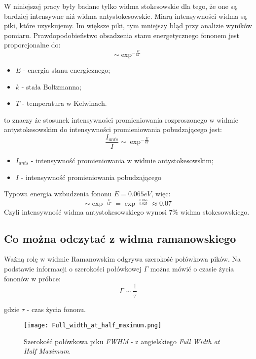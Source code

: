 \vspace{1cm}
W niniejszej pracy były badane tylko widma stokesowskie dla tego, że one są bardziej intensywne niż widma antystokesowskie. Miarą intensywności widma są piki, które uzyskujemy. Im większe piki, tym mniejszy błąd przy analizie wyników pomiaru.
Prawdopodobieństwo obsadzenia stanu energetycznego fononem jest proporcjonalne do:
\begin{equation}
	\sim \exp^{-\frac{E}{kT}} 
\end{equation}
\begin{itemize}
	\item{$E$ - energia stanu energicznego};
	\item{$k$ - stała Boltzmanna};
	\item{$T$ - temperatura w Kelwinach}.
\end{itemize}
to znaczy że stosunek intensywności promieniowania rozproszonego w widmie antystokesowskim
do intensywności promieniowania pobudzającego jest:
\begin{equation}
	\frac{I_{ants}}{I} \sim \exp^{-\frac{E}{kT}}
\end{equation}
\begin{itemize}
	\item{$I_{ants}$ - intensywność promieniowania w widmie antystokesowskim};
	\item{$I$ - intensywność promieniowania pobudzającego}
\end{itemize}
	Typowa energia wzbudzenia fononu $E = 0.065eV$, więc:
\begin{equation}
	\sim \exp^{-\frac{E}{kT}} = \exp^{-\frac{0.065}{0.025}} \approx 0.07
\end{equation}
Czyli intensywność widma antystokesowskiego wynosi $7\%$ widma stokesowskiego. 
\subsection{Co można odczytać z widma ramanowskiego}
Ważną rolę w widmie Ramanowskim odgrywa szerokość połówkowa pików.
Na podstawie informacji o szerokości połówkowej $\Gamma$ można mówić o czasie życia fononów w próbce:
\begin{equation}
	\Gamma \sim \frac{1}{\tau}
\end{equation}

gdzie $\tau$ - czas życia fononu.

\begin{figure}[H]
	\begin{center}
		\texttt{[image: Full\_width\_at\_half\_maximum.png]}
		\caption{Szerokość połówkowa piku \textit{FWHM} - z angielskiego \textit{Full Width at Half Maximum}.}
	\end{center}
\end{figure}

